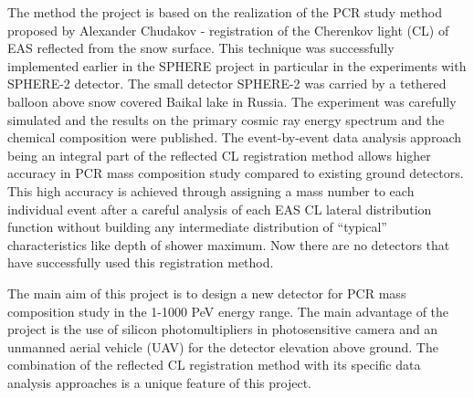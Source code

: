 \documentclass[a4paper]{jpconf}
\begin{document}
The method the project is based on the realization of the PCR study method~\cite{Chu74} proposed by Alexander Chudakov - registration of the Cherenkov light (CL) of EAS reflected from the snow surface. This technique was successfully implemented earlier in the SPHERE project\cite{Ant15a} in particular in the experiments with SPHERE-2 detector\cite{Ant20}. The small detector SPHERE-2 was carried by a tethered balloon above snow covered Baikal lake in Russia. The experiment was carefully simulated\cite{Ant19} and the results on the primary cosmic ray energy spectrum and the chemical composition were published\cite{Ant15c}. The event-by-event data analysis approach being an integral part of the reflected CL registration method allows higher accuracy in PCR mass composition study compared to existing ground detectors. This high accuracy is achieved through assigning a mass number to each individual event after a careful analysis of each EAS CL lateral distribution function without building any intermediate distribution of “typical” characteristics like depth of shower maximum. Now there are no detectors that have successfully used this registration method. 

The main aim of this project is to design a new detector for PCR mass composition study in the 1-1000 PeV energy range. The main advantage of the project is the use of silicon photomultipliers in photosensitive camera and an unmanned aerial vehicle (UAV) for the detector elevation above ground. The combination of the reflected CL registration method with its specific data analysis approaches is a unique feature of this project. 
\end{document}
